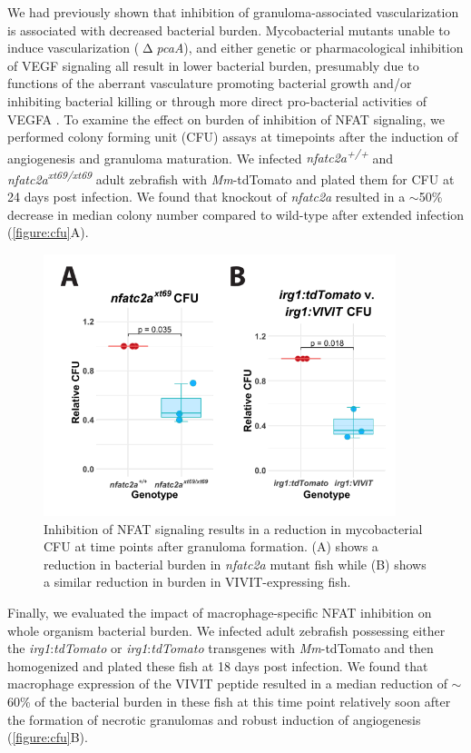 We had previously shown that inhibition of granuloma-associated vascularization is associated with decreased bacterial burden. Mycobacterial mutants unable to induce vascularization ($\upDelta$\textit{pcaA}), and either genetic or pharmacological inhibition of VEGF signaling all result in lower bacterial burden, presumably due to functions of the aberrant vasculature promoting bacterial growth and/or inhibiting bacterial killing \citep{Rao2005, Glickman2000, Oehlers2015, Walton2018} or through more direct pro-bacterial activities of VEGFA \citep{Harding2019}. To examine the effect on burden of inhibition of NFAT signaling, we performed colony forming unit (CFU) assays at timepoints after the induction of angiogenesis and granuloma maturation. We infected \textit{nfatc2a\textsuperscript{+/+}} and \textit{nfatc2a\textsuperscript{xt69/xt69}} adult zebrafish with \textit{Mm}-tdTomato and plated them for CFU at 24 days post infection. We found that knockout of \textit{nfatc2a} resulted in a ${\sim}$50\% decrease in median colony number compared to wild-type after extended infection (\autoref{figure:cfu}A). 

\begin{figure}
\centering
\includegraphics[height=3in]{images/cfu.pdf}
\caption{Inhibition of NFAT signaling results in a reduction in mycobacterial CFU at time points after granuloma formation. (A) shows a reduction in bacterial burden in \textit{nfatc2a} mutant fish while (B) shows a similar reduction in burden in VIVIT-expressing fish.}
\label{figure:cfu}

\end{figure}

Finally, we evaluated the impact of macrophage-specific NFAT inhibition on whole organism bacterial burden. We infected adult zebrafish possessing either the \textit{irg1}:\textit{tdTomato} or \textit{irg1}:\textit{tdTomato} transgenes with \textit{Mm}-tdTomato and then homogenized and plated these fish at 18 days post infection. We found that macrophage expression of the VIVIT peptide resulted in a median reduction of ${\sim}$60\% of the bacterial burden in these fish at this time point relatively soon after the formation of necrotic granulomas and robust induction of angiogenesis (\autoref{figure:cfu}B).
 
